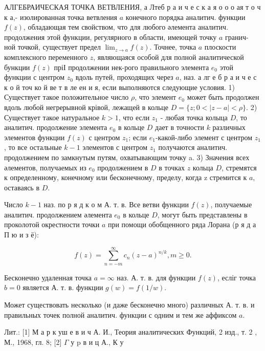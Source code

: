 \documentclass[10pt]{article}
\begin{document}
АЛГЕБРАИЧЕСКАЯ ТОЧКА ВЕТВЛЕНИЯ, а Лтеб р а и ч е с к а я о о о ая т о ч к а,- изолированная точка ветвления $a$ конечного порядка аналитич. функции $f(z)$, обладающая тем свойством, что для любого әлемента аналитич. продолжения этой функции, регулярного в области, имеющей точку $a$ гранич- ной точкой, существует предел $\lim _{z \rightarrow a} f(z)$. Точнее, точка $a$ плоскости комплексного переменного $z$, являющаяся особой для полной аналитической бункции $f(z)$ пріІ продолжении нек-рого правильного элемента $e_{0}$ этой функции с центром $z_{0}$ вдоль путей, проходящих через $a$, наз. а лг е б р а и ч е с к о й точ ко й ве т в ле ен и я, если выполняются следующие условия. 1) Существует такое положительное число $\rho$, что элемент $e_{0}$ может быть продолжен вдоль любой негрерывной крівой, лежащей в кольце $D=\{z ; 0<|z-a|<\rho\}$. 2) Существует такое натуральное $k>1$, что если $z_{1}$ - любая точка колыца $D$, то аналитич. продолжение элемента $e_{0}$ в кольце $D$ дает в точности $k$ различных элементов функции $f(z)$ с центром $z_{1}$; если $e_{1}$-какой-либо элемент с центром $z_{1}$, то все остальные $k-1$ элементов с центром $z_{1}$ получаются аналитич. продолжением по замкнутым путям, охватывающим точку a. 3) Значения всех әлементов, получаемых из $e_{0}$ продолжением в $D$ в точках $z$ кольца $D$, стремятся к определенному, конечному или бесконечному, пределу, когда z стремится к $a$, оставаясь в $D$.



Число $k-1$ наз. по р я д к о м А. т. в. Все ветви функции $f(z)$, получаемые аналитич. продолжением әлемента $e_{0}$ в кольце $D$, могут быть представлены в проколотой окрестности точки $a$ при помощи обобщенного ряда Лорана (р я д а П ю и з ё):



\[

f(z)=\sum_{n=-m}^{\infty} c_{n}(z-a)^{n / k}, m \geqslant 0 .

\]



Бесконечно удаленная точка $a=\infty$ наз. А. т. в. для функции $f(z)$, есліг точка $b=0$ является А. т. в. функции $g(w)=f(1 / w)$.



Может существовать несколько (и даже бесконечно много) различных А. т. в. и правильных точек полной аналитич. функции с одним и тем же аффиксом $a$.



Лит.: [1] М а р к уш е в и ч А. И., Теория аналитических Функций, 2 изд., т. 2 , М., 1968, гл. 8; [2] $\Gamma$ у p в и ц А., К у
\end{document}
